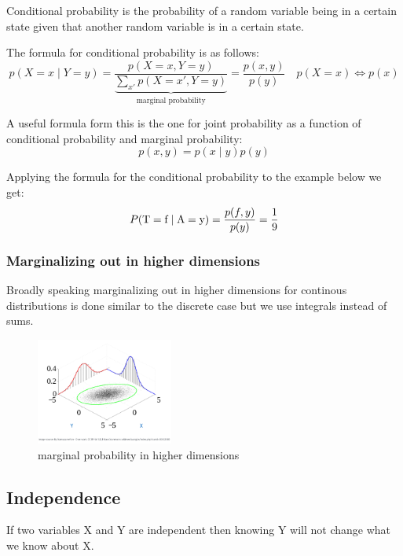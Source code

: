 \documentclass[12pt]{article}
\begin{document}
\begin{definition}
    Conditional probability is the probability of a random variable being in a certain state given that another random variable is in a certain state.
\end{definition}

The formula for conditional probability is as follows:
\[
    p(X = x\mid Y = y) = \frac{p(X = x, Y = y)}{\underbrace{\sum_{x'} p(X = x', Y = y)}_{\text{marginal probability}}} = \frac{p(x, y)}{p(y)} \quad p(X = x) \Leftrightarrow p(x)
\]  

A useful formula form this is the one for joint probability as a function of conditional probability and marginal probability:
\[
    p(x, y) = p(x\mid y) p(y)  
\]

Applying the formula for the conditional probability to the example below we get:
\[
    P(\text T = \text f \mid  \text A = \text y) = \frac{p(f, y)}{p(y)} = \frac{1}{9}    
\]

\subsubsection*{Marginalizing out in higher dimensions}

Broadly speaking marginalizing out in higher dimensions for continous distributions is done similar to the discrete case but we use integrals instead of sums. 

\begin{figure}[h!]
    \centering
    \includegraphics[width=0.4\textwidth]{assets/hdmarginalprob.png}
    \caption{marginal probability in higher dimensions}
\end{figure}

\subsection{Independence}

\begin{definition}[Independence]
    If two variables X and Y are independent then knowing Y will not change what we know about X. 
\end{definition}
\end{document}
